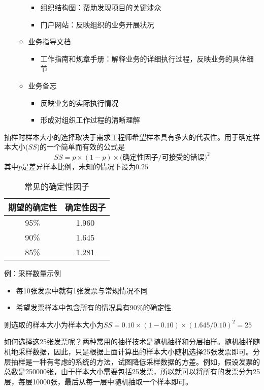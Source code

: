 \begin{shaded}
\begin{itemize}
\begin{itemize}
        \begin{itemize}
            \item 组织结构图：帮助发现项目的关键涉众
            \item 门户网站：反映组织的业务开展状况
        \end{itemize}
        \item 业务指导文档
        \begin{itemize}
            \item  工作指南和规章手册：解释业务的详细执行过程，反映业务的具体细节
        \end{itemize}
        \item 业务备忘
        \begin{itemize}
            \item 反映业务的实际执行情况
            \item 形成对组织工作过程的清晰理解
        \end{itemize}
    \end{itemize}
\end{itemize}

抽样时样本大小的选择取决于需求工程师希望样本具有多大的代表性。用于确定样本大小($SS$)的一个简单而有效的公式是
$$SS = p\times (1-p) \times \mbox{(确定性因子/可接受的错误)}^2$$
其中$p$是差异样本比例，未知的情况下设为$0.25$

\begin{wraptable}{r}{6.5cm}
    \centering
    \vspace{-1.5em}
    \begin{tabular}{|c|c|}
    \hline
    期望的确定性 & 确定性因子 \\ \hline
    95\% & 1.960  \\ \hline
    90\% & 1.645  \\ \hline
    85\% & 1.281  \\ \hline
    \end{tabular}
    \caption*{常见的确定性因子}
    \vspace{-3em}
\end{wraptable}

例：采样数量示例
\begin{itemize}
    \item 每10张发票中就有1张发票与常规情况不同 
    \item 希望发票样本中包含所有的情况具有90\%的确定性 
\end{itemize}
则选取的样本大小为样本大小为$SS=0.10\times (1-0.10)\times(1.645/0.10)^2=25$

如何选择这25张发票呢？两种常用的抽样技术是随机抽样和分层抽样。随机抽样随机地采样数据，因此，只是根据上面计算出的样本大小随机选择25张发票即可。分层抽样是一种有考虑的系统的方法，试图降低采样数据的方差。例如，假设发票的总数是250000张，由于样本大小需要包括25发票，所以就可以将所有的发票分为25层，每层10000张，最后从每一层中随机抽取一个样本即可。
\end{shaded}
\vspace{-1em}

